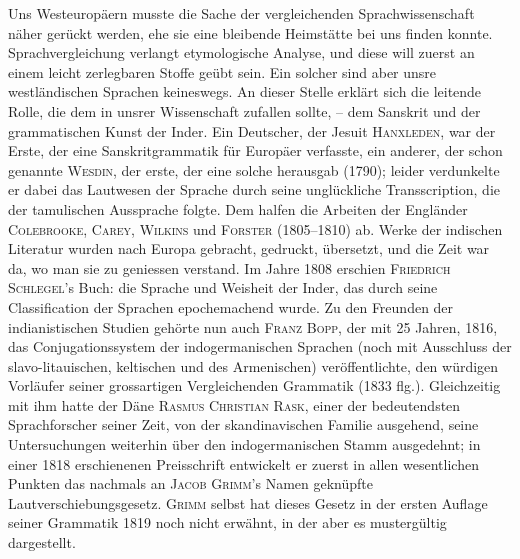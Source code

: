 \label{I.IV.sanskritstudien}
Uns Westeuropäern musste die Sache der vergleichenden Sprachwissenschaft näher gerückt werden, ehe sie eine bleibende Heimstätte bei uns finden konnte. Sprachvergleichung verlangt etymologische Analyse, und diese will zuerst an einem leicht zerlegbaren Stoffe geübt sein. Ein solcher sind aber unsre westländischen Sprachen keineswegs. An dieser Stelle erklärt sich die leitende Rolle, die dem  in unsrer Wissenschaft zufallen sollte, – dem Sanskrit und der grammatischen Kunst der Inder. Ein Deutscher, der Jesuit \textsc{Hanxleden}, war der Erste, der eine Sanskritgrammatik für Europäer verfasste, ein anderer, der schon genannte \textsc{Wesdin}, der erste, der eine solche herausgab (1790); leider verdunkelte er dabei das Lautwesen der Sprache durch seine unglückliche Transscription, die der tamulischen Aussprache folgte. Dem halfen die Arbeiten der Engländer \textsc{Colebrooke}, \textsc{Carey}, \textsc{Wilkins} und \textsc{Forster} (1805–1810) ab. Werke der indischen Literatur wurden nach Europa gebracht, gedruckt, übersetzt, und die Zeit war da, wo man sie zu geniessen verstand.  Im Jahre 1808 erschien \textsc{Friedrich Schlegel}’s Buch:  die Sprache und Weisheit der Inder, das durch seine Classification der Sprachen epochemachend wurde. Zu den Freunden der indianistischen Studien gehörte nun auch \textsc{Franz Bopp}, der mit 25 Jahren, 1816, das Conjugationssystem der indogermanischen Sprachen (noch mit Ausschluss der slavo-litauischen, keltischen und des Armenischen) veröffentlichte, den würdigen Vorläufer seiner grossartigen Vergleichenden Grammatik (1833 flg.). Gleichzeitig mit ihm hatte der Däne \textsc{Rasmus Christian Rask}, einer der bedeutendsten Sprach\-\label{sp.27}forscher seiner Zeit, von der skandinavischen Familie ausgehend, seine Untersuchungen weiterhin über den indogermanischen Stamm ausgedehnt; in einer 1818 erschie\-\label{fp.27}nenen Preisschrift entwickelt er zuerst in allen wesentlichen Punkten das nachmals an \textsc{Jacob Grimm}’s Namen geknüpfte Lautverschiebungsgesetz. \textsc{Grimm} selbst hat dieses Gesetz in der ersten Auflage seiner Grammatik 1819 noch nicht erwähnt, in der  aber es mustergültig dargestellt. 

